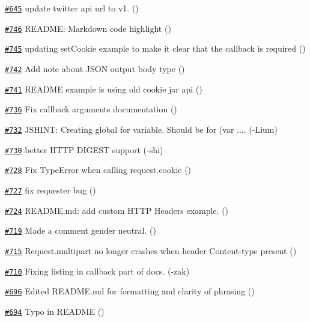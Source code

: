 \begin{DoxyItemize}
\item \href{https://github.com/request/request/pull/645}{\tt \#645} update twitter api url to v1. ()
\item \href{https://github.com/request/request/pull/746}{\tt \#746} R\+E\+A\+D\+ME\+: Markdown code highlight ()
\item \href{https://github.com/request/request/pull/745}{\tt \#745} updating set\+Cookie example to make it clear that the callback is required ()
\item \href{https://github.com/request/request/pull/742}{\tt \#742} Add note about J\+S\+ON output body type ()
\item \href{https://github.com/request/request/pull/741}{\tt \#741} R\+E\+A\+D\+ME example is using old cookie jar api ()
\item \href{https://github.com/request/request/pull/736}{\tt \#736} Fix callback arguments documentation ()
\item \href{https://github.com/request/request/pull/732}{\tt \#732} J\+S\+H\+I\+NT\+: Creating global \textquotesingle{}for\textquotesingle{} variable. Should be \textquotesingle{}for (var ...\textquotesingle{}. (-\/\+Lium)
\item \href{https://github.com/request/request/pull/730}{\tt \#730} better H\+T\+TP D\+I\+G\+E\+ST support (-\/shi)
\item \href{https://github.com/request/request/pull/728}{\tt \#728} Fix Type\+Error when calling request.\+cookie ()
\item \href{https://github.com/request/request/pull/727}{\tt \#727} fix requester bug ()
\item \href{https://github.com/request/request/pull/724}{\tt \#724} R\+E\+A\+D\+M\+E.\+md\+: add custom H\+T\+TP Headers example. ()
\item \href{https://github.com/request/request/pull/719}{\tt \#719} Made a comment gender neutral. ()
\item \href{https://github.com/request/request/pull/715}{\tt \#715} Request.\+multipart no longer crashes when header \textquotesingle{}Content-\/type\textquotesingle{} present ()
\item \href{https://github.com/request/request/pull/710}{\tt \#710} Fixing listing in callback part of docs. (-\/zak)
\item \href{https://github.com/request/request/pull/696}{\tt \#696} Edited R\+E\+A\+D\+M\+E.\+md for formatting and clarity of phrasing ()
\item \href{https://github.com/request/request/pull/694}{\tt \#694} Typo in R\+E\+A\+D\+ME ()

\end{DoxyItemize}
